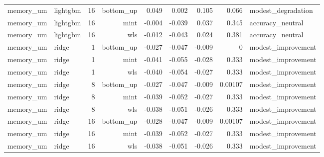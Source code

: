 \begin{tabular}{llrrrrrrl}
memory_um & lightgbm & 16 & bottom_up & 0.049 & 0.002 & 0.105 & 0.066 & modest_degradation \\
memory_um & lightgbm & 16 & mint & -0.004 & -0.039 & 0.037 & 0.345 & accuracy_neutral \\
memory_um & lightgbm & 16 & wls & -0.012 & -0.043 & 0.024 & 0.381 & accuracy_neutral \\
memory_um & ridge & 1 & bottom_up & -0.027 & -0.047 & -0.009 & 0 & modest_improvement \\
memory_um & ridge & 1 & mint & -0.041 & -0.055 & -0.028 & 0.333 & modest_improvement \\
memory_um & ridge & 1 & wls & -0.040 & -0.054 & -0.027 & 0.333 & modest_improvement \\
memory_um & ridge & 8 & bottom_up & -0.027 & -0.047 & -0.009 & 0.00107 & modest_improvement \\
memory_um & ridge & 8 & mint & -0.039 & -0.052 & -0.027 & 0.333 & modest_improvement \\
memory_um & ridge & 8 & wls & -0.038 & -0.051 & -0.026 & 0.333 & modest_improvement \\
memory_um & ridge & 16 & bottom_up & -0.028 & -0.047 & -0.009 & 0.00107 & modest_improvement \\
memory_um & ridge & 16 & mint & -0.039 & -0.052 & -0.027 & 0.333 & modest_improvement \\
memory_um & ridge & 16 & wls & -0.038 & -0.051 & -0.026 & 0.333 & modest_improvement \\
\hline
\end{tabular}
